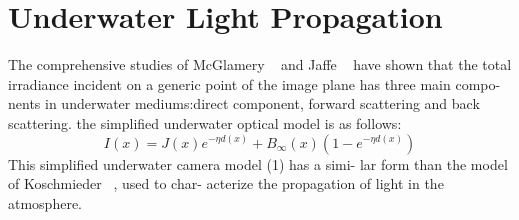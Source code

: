 \documentclass[10pt,twocolumn,letterpaper]{article}
\begin{document}
\section{Underwater Light Propagation}
The comprehensive studies of McGlamery ~\cite{computer1979_2} and
Jaffe ~\cite{Computer1990_3} have shown that the total irradiance incident on
a generic point of the image plane has three main compo-
nents in underwater mediums:direct component, forward
scattering and back scattering.
the simplified underwater optical model is as follows:
\begin{equation}
I(x) = J(x)e^{-\eta d(x)}+B_{∞}(x)(1-e^{-\eta d(x)})
\end{equation}
This simplified underwater camera model (1) has a simi-
lar form than the model of Koschmieder ~\cite{Theorie1924_4}, used to char-
acterize the propagation of light in the atmosphere.





{\small


}
\end{document}

